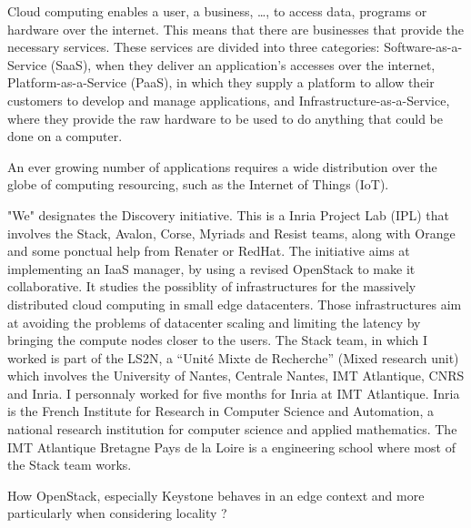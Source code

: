 Cloud computing enables a user, a business, \dots, to access data, programs or hardware over the internet. This means that there are businesses that provide the necessary services. These services are divided into three categories: Software-as-a-Service (SaaS), when they deliver an application's accesses over the internet, Platform-as-a-Service (PaaS), in which they supply a platform to allow their customers to develop and manage applications, and Infrastructure-as-a-Service, where they provide the raw hardware to be used to do anything that could be done on a computer.

An ever growing number of applications requires a wide distribution over the globe of computing resourcing, such as the Internet of Things (IoT).





"We" designates the Discovery initiative\cite{discovery}. This is a Inria Project Lab (IPL) that involves the Stack, Avalon, Corse, Myriads and Resist teams, along with Orange and some ponctual help from Renater or RedHat. The initiative aims at implementing an IaaS manager, by using a revised OpenStack to make it collaborative. It studies the possiblity of infrastructures for the massively distributed cloud computing in small edge datacenters. Those infrastructures aim at avoiding the problems of datacenter scaling and limiting the latency by bringing the compute nodes closer to the users.
The Stack team, in which I worked is part of the LS2N, a ``Unité Mixte de Recherche'' (Mixed research unit) which involves the University of Nantes, Centrale Nantes, IMT Atlantique, CNRS and Inria. I personnaly worked for five months for Inria at IMT Atlantique. Inria is the French Institute for Research in Computer Science and Automation, a national research institution for computer science and applied mathematics. The IMT Atlantique Bretagne Pays de la Loire is a engineering school where most of the Stack team works.









How OpenStack, especially Keystone behaves in an edge context and more particularly when considering locality ?













